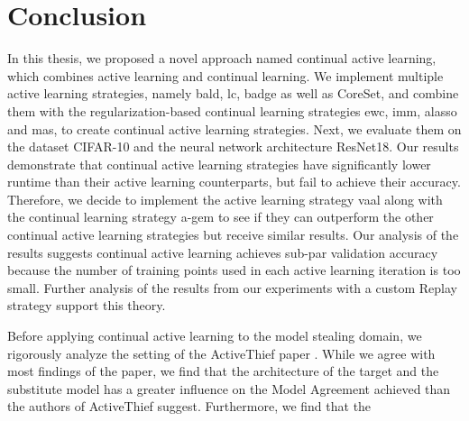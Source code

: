 
\chapter{Conclusion}
\label{ch:Conclusion}
In this thesis, we proposed a novel approach named continual active learning, which combines active learning and continual learning. 
We implement multiple active learning strategies, namely \gls{bald}, \gls{lc}, \gls{badge} as well as CoreSet, and combine them with
the regularization-based continual learning strategies \gls{ewc}, \gls{imm}, \gls{alasso} and \gls{mas}, to create continual active
learning strategies. Next, we evaluate them on the dataset CIFAR-10 and the neural network architecture ResNet18. Our results demonstrate
that continual active learning strategies have significantly lower runtime than their active learning counterparts, but fail to achieve
their accuracy. Therefore, we decide to implement the active learning strategy \gls{vaal} along with the continual learning strategy \gls{a-gem}
to see if they can outperform the other continual active learning strategies but receive similar results. Our analysis of the results
suggests continual active learning achieves sub-par validation accuracy because the number of training points used in each active
learning iteration is too small. Further analysis of the results from our experiments with a custom Replay strategy support this theory. \par
Before applying continual active learning to the model stealing domain, we rigorously analyze the setting of the ActiveThief paper
\cite{pal2020activethief}. While we agree with most findings of the paper, we find that the architecture of the target and the substitute
model has a greater influence on the Model Agreement achieved than the authors of ActiveThief suggest. Furthermore, we find that the
